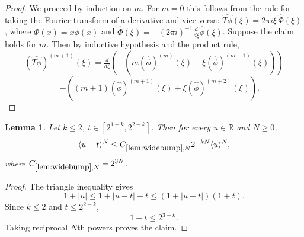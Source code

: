 \documentclass[12pt,reqno]{amsart}
\theoremstyle{plain}
\newtheorem{lemma}[theorem]{Lemma}
\numberwithin{equation}{section}
\theoremstyle{remark}
\newcommand{\uses}[1]{}
\newcommand{\usesdefs}[1]{}
\newcommand{\R}{{\mathbb R}}
\begin{document}
\begin{proof}
We proceed by induction on $m$.
For $m=0$ this follows from the rule for taking the Fourier transform of a derivative and vice versa:
$\widehat{T\phi}(\xi) = 2\pi i \xi\,\widehat{\Phi}(\xi)$,
where $\Phi(x)=x \phi(x)$ and $\widehat{\Phi}(\xi) = -(2\pi i)^{-1} \frac{d}{d\xi} \widehat{\phi}(\xi)$.
Suppose the claim holds for $m$. Then by inductive hypothesis and the product rule,
\[ (\widehat{T\phi})^{(m+1)}(\xi) = \tfrac{d}{d\xi} (-(m (\widehat{\phi})^{(m)}(\xi) + \xi (\widehat{\phi})^{(m+1)}(\xi))) \]
\[ = -((m+1) (\widehat{\phi})^{(m+1)}(\xi) + \xi (\widehat{\phi})^{(m+2)}(\xi)). \]
\end{proof}


\begin{lemma} \label{lem:widebump}\uses{}\usesdefs{bracket bump}
Let $k \leq 2$, $t\in [2^{1-k}, 2^{2-k}]$. Then for every $u\in \R$ and $N\ge 0$,
\begin{equation}\label{auto:wide-bump-translation-bound}\langle u-t\rangle^{N} \le C_{\ref{lem:widebump},N} 2^{-kN}\langle u\rangle^{N},\end{equation}
where $C_{\ref{lem:widebump},N}=2^{3N}$.
\end{lemma}
\begin{proof}
The triangle inequality gives
\[
1+|u|\le1+|u-t|+t\le(1+|u-t|)(1+t).
\]
Since $k\le2$ and $t\le2^{2-k}$,
\[
1+t\le2^{3-k}.
\]
Taking reciprocal $N$th powers proves the claim.
\end{proof}
\end{document}
